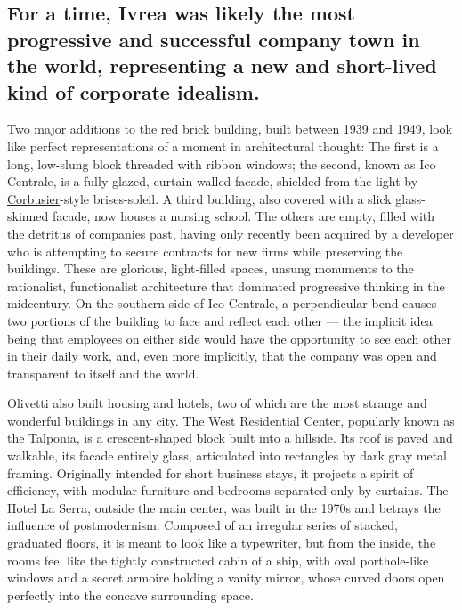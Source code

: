 \hypertarget{for-a-time-ivrea-was-likely-the-most-progressive-and-successful-company-town-in-the-world-representing-a-new-and-short-lived-kind-of-corporate-idealism}{%
\subsection{For a time, Ivrea was likely the most progressive and
successful company town in the world, representing a new and short-lived
kind of corporate
idealism.}\label{for-a-time-ivrea-was-likely-the-most-progressive-and-successful-company-town-in-the-world-representing-a-new-and-short-lived-kind-of-corporate-idealism}}

Two major additions to the red brick building, built between 1939 and
1949, look like perfect representations of a moment in architectural
thought: The first is a long, low-slung block threaded with ribbon
windows; the second, known as Ico Centrale, is a fully glazed,
curtain-walled facade, shielded from the light by
\href{https://www.nytimes.com/2018/08/08/t-magazine/le-corbusier-japan-modernism.html}{Corbusier}-style
brises-soleil. A third building, also covered with a slick glass-skinned
facade, now houses a nursing school. The others are empty, filled with
the detritus of companies past, having only recently been acquired by a
developer who is attempting to secure contracts for new firms while
preserving the buildings. These are glorious, light-filled spaces,
unsung monuments to the rationalist, functionalist architecture that
dominated progressive thinking in the midcentury. On the southern side
of Ico Centrale, a perpendicular bend causes two portions of the
building to face and reflect each other --- the implicit idea being that
employees on either side would have the opportunity to see each other in
their daily work, and, even more implicitly, that the company was open
and transparent to itself and the world.

Olivetti also built housing and hotels, two of which are the most
strange and wonderful buildings in any city. The West Residential
Center, popularly known as the Talponia, is a crescent-shaped block
built into a hillside. Its roof is paved and walkable, its facade
entirely glass, articulated into rectangles by dark gray metal framing.
Originally intended for short business stays, it projects a spirit of
efficiency, with modular furniture and bedrooms separated only by
curtains. The Hotel La Serra, outside the main center, was built in the
1970s and betrays the influence of postmodernism. Composed of an
irregular series of stacked, graduated floors, it is meant to look like
a typewriter, but from the inside, the rooms feel like the tightly
constructed cabin of a ship, with oval porthole-like windows and a
secret armoire holding a vanity mirror, whose curved doors open
perfectly into the concave surrounding space.

